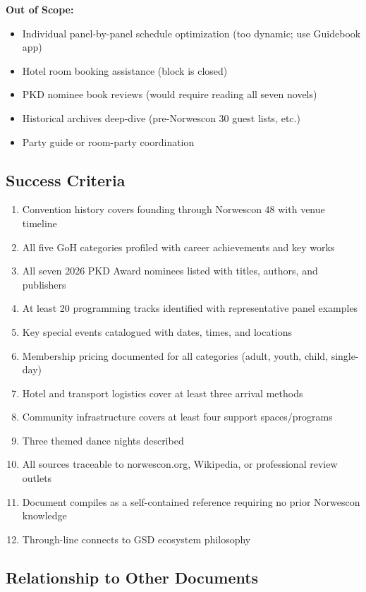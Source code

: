 \documentclass[11pt,letterpaper]{article}
\begin{document}
\textbf{Out of Scope:}
\begin{itemize}[leftmargin=2em]
\item Individual panel-by-panel schedule optimization (too dynamic; use Guidebook app)
\item Hotel room booking assistance (block is closed)
\item PKD nominee book reviews (would require reading all seven novels)
\item Historical archives deep-dive (pre-Norwescon 30 guest lists, etc.)
\item Party guide or room-party coordination
\end{itemize}

\subsection{Success Criteria}

\begin{enumerate}[leftmargin=2em]
\item Convention history covers founding through Norwescon 48 with venue timeline
\item All five GoH categories profiled with career achievements and key works
\item All seven 2026 PKD Award nominees listed with titles, authors, and publishers
\item At least 20 programming tracks identified with representative panel examples
\item Key special events catalogued with dates, times, and locations
\item Membership pricing documented for all categories (adult, youth, child, single-day)
\item Hotel and transport logistics cover at least three arrival methods
\item Community infrastructure covers at least four support spaces/programs
\item Three themed dance nights described
\item All sources traceable to norwescon.org, Wikipedia, or professional review outlets
\item Document compiles as a self-contained reference requiring no prior Norwescon knowledge
\item Through-line connects to GSD ecosystem philosophy
\end{enumerate}

\subsection{Relationship to Other Documents}
\end{document}
